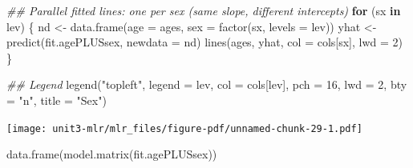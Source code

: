 \documentclass[
  letterpaper,
]{scrbook}
\newenvironment{Shaded}{\begin{snugshade}}{\end{snugshade}}
\newcommand{\AttributeTok}[1]{\textcolor[rgb]{0.40,0.45,0.13}{#1}}
\newcommand{\ControlFlowTok}[1]{\textcolor[rgb]{0.00,0.23,0.31}{\textbf{#1}}}
\newcommand{\DecValTok}[1]{\textcolor[rgb]{0.68,0.00,0.00}{#1}}
\newcommand{\DocumentationTok}[1]{\textcolor[rgb]{0.37,0.37,0.37}{\textit{#1}}}
\newcommand{\FunctionTok}[1]{\textcolor[rgb]{0.28,0.35,0.67}{#1}}
\newcommand{\NormalTok}[1]{\textcolor[rgb]{0.00,0.23,0.31}{#1}}
\newcommand{\OtherTok}[1]{\textcolor[rgb]{0.00,0.23,0.31}{#1}}
\newcommand{\StringTok}[1]{\textcolor[rgb]{0.13,0.47,0.30}{#1}}
\begin{document}
\begin{Shaded}
\begin{Highlighting}[]
\DocumentationTok{\#\# Parallel fitted lines: one per sex (same slope, different intercepts)}
\ControlFlowTok{for}\NormalTok{ (sx }\ControlFlowTok{in}\NormalTok{ lev) \{}
\NormalTok{  nd }\OtherTok{\textless{}{-}} \FunctionTok{data.frame}\NormalTok{(}\AttributeTok{age =}\NormalTok{ ages, }\AttributeTok{sex =} \FunctionTok{factor}\NormalTok{(sx, }\AttributeTok{levels =}\NormalTok{ lev))}
\NormalTok{  yhat }\OtherTok{\textless{}{-}} \FunctionTok{predict}\NormalTok{(fit.agePLUSsex, }\AttributeTok{newdata =}\NormalTok{ nd)}
  \FunctionTok{lines}\NormalTok{(ages, yhat, }\AttributeTok{col =}\NormalTok{ cols[sx], }\AttributeTok{lwd =} \DecValTok{2}\NormalTok{)}
\NormalTok{\}}

\DocumentationTok{\#\# Legend}
\FunctionTok{legend}\NormalTok{(}\StringTok{"topleft"}\NormalTok{, }\AttributeTok{legend =}\NormalTok{ lev, }\AttributeTok{col =}\NormalTok{ cols[lev], }\AttributeTok{pch =} \DecValTok{16}\NormalTok{, }\AttributeTok{lwd =} \DecValTok{2}\NormalTok{, }\AttributeTok{bty =} \StringTok{"n"}\NormalTok{, }\AttributeTok{title =} \StringTok{"Sex"}\NormalTok{)}
\end{Highlighting}
\end{Shaded}

\texttt{[image: unit3-mlr/mlr\_files/figure-pdf/unnamed-chunk-29-1.pdf]}

\begin{Shaded}
\begin{Highlighting}[]
\FunctionTok{data.frame}\NormalTok{(}\FunctionTok{model.matrix}\NormalTok{(fit.agePLUSsex))}
\end{Highlighting}
\end{Shaded}
\end{document}
